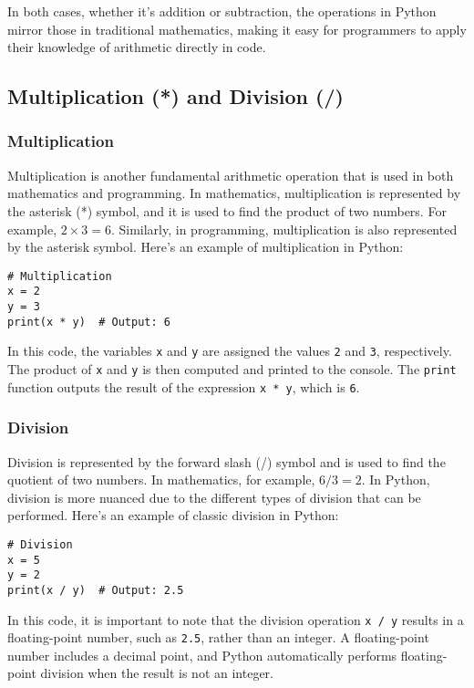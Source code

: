 In both cases, whether it's addition or subtraction, the operations in Python mirror those in traditional mathematics, making it easy for programmers to apply their knowledge of arithmetic directly in code.

\subsection{Multiplication (*) and Division (/)}

\subsubsection{Multiplication}
Multiplication is another fundamental arithmetic operation that is used in both mathematics and programming. In mathematics, multiplication is represented by the asterisk (*) symbol, and it is used to find the product of two numbers. For example, $2 \times 3 = 6$. Similarly, in programming, multiplication is also represented by the asterisk symbol. Here's an example of multiplication in Python:

\begin{lstlisting}
# Multiplication
x = 2
y = 3
print(x * y)  # Output: 6
\end{lstlisting}

In this code, the variables \lstinline|x| and \lstinline|y| are assigned the values \lstinline|2| and \lstinline|3|, respectively. The product of \lstinline|x| and \lstinline|y| is then computed and printed to the console. The \lstinline|print| function outputs the result of the expression \lstinline|x * y|, which is \lstinline|6|.
\subsubsection{Division}

Division is represented by the forward slash (/) symbol and is used to find the quotient of two numbers. In mathematics, for example, $6 / 3 = 2$. In Python, division is more nuanced due to the different types of division that can be performed. Here's an example of classic division in Python:

\begin{lstlisting}
# Division
x = 5
y = 2
print(x / y)  # Output: 2.5
\end{lstlisting}

In this code, it is important to note that the division operation \lstinline|x / y| results in a floating-point number, such as \lstinline|2.5|, rather than an integer. A floating-point number includes a decimal point, and Python automatically performs floating-point division when the result is not an integer.

